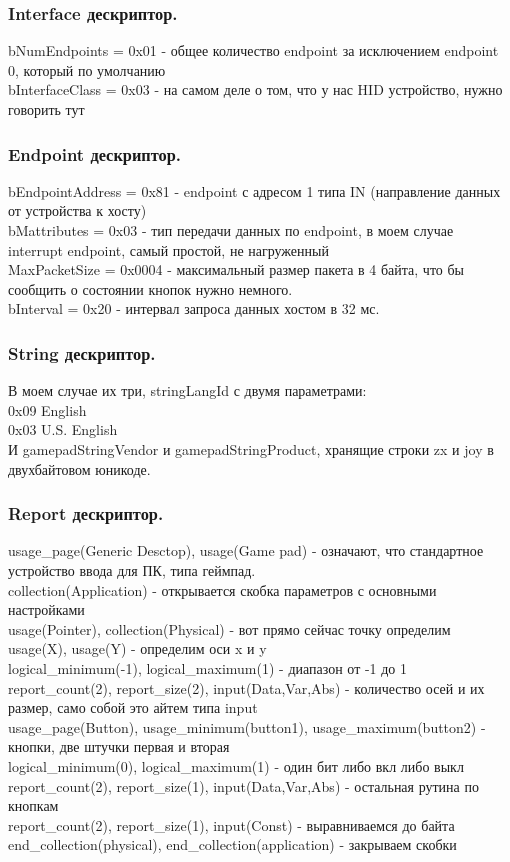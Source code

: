 \documentclass[12pt,a4paper]{article}
\begin{document}
\subsubsection{Interface дескриптор.}
    bNumEndpoints = 0x01 - общее количество endpoint за исключением endpoint 0,
    который по умолчанию\\
    bInterfaceClass = 0x03 - на самом деле о том, что у нас HID устройство,
    нужно говорить тут\\
\subsubsection{Endpoint дескриптор.}
    bEndpointAddress = 0x81 -  endpoint с адресом 1 типа IN (направление данных
    от устройства к хосту)\\
    bMattributes = 0x03 - тип передачи данных по endpoint, в моем случае
    interrupt endpoint, самый простой, не нагруженный\\
    MaxPacketSize = 0x0004 - максимальный размер пакета в 4 байта, что бы
    сообщить о состоянии кнопок нужно немного.\\
    bInterval = 0x20 - интервал запроса данных хостом в 32 мс.
\subsubsection{String дескриптор.}
    В моем случае их три, stringLangId с двумя параметрами:\\
    0x09 English\\
    0x03 U.S. English\\
    И gamepadStringVendor и gamepadStringProduct, хранящие строки zx и joy в
    двухбайтовом юникоде.
\subsubsection{Report дескриптор.}
    usage\_page(Generic Desctop), usage(Game pad) - означают, что стандартное
    устройство ввода для ПК, типа геймпад.\\
    collection(Application) - открывается скобка параметров с основными
    настройками\\
    usage(Pointer), collection(Physical) - вот прямо сейчас точку определим\\
    usage(X), usage(Y) - определим оси x и y\\
    logical\_minimum(-1), logical\_maximum(1) - диапазон от -1 до 1\\
    report\_count(2), report\_size(2), input(Data,Var,Abs) - количество осей и их
    размер, само собой это айтем типа input\\
    usage\_page(Button), usage\_minimum(button1), usage\_maximum(button2) - кнопки,
    две штучки первая и вторая\\
    logical\_minimum(0), logical\_maximum(1) - один бит либо вкл либо выкл\\
    report\_count(2), report\_size(1), input(Data,Var,Abs) - остальная рутина по
    кнопкам\\
    report\_count(2), report\_size(1), input(Const) - выравниваемся до байта\\
    end\_collection(physical), end\_collection(application) - закрываем скобки
\end{document}
